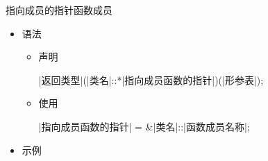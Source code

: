 \begin{frame}[t, fragile]{指向成员的指针}{函数成员}%
  \begin{itemize}
  \item 语法
    \begin{itemize}
    \item 声明\\
      \begin{center}
        \begin{minipage}{0.8\linewidth}
          \begin{cpptt}
|返回类型|(|类名|::*|指向成员函数的指针|)(|形参表|);
          \end{cpptt}
        \end{minipage}
      \end{center}  
    \item 使用\\
      \begin{center}
        \begin{minipage}{0.8\linewidth}
          \begin{cpptt}
|指向成员函数的指针| = &|类名|::|函数成员名称|;
          \end{cpptt}
        \end{minipage}
      \end{center}
    \end{itemize}    
  \item 示例\\
    \begin{center}
      \begin{minipage}{0.55\linewidth}
      \end{minipage}
      \begin{minipage}{0.4\linewidth}
      \end{minipage} 
    \end{center}
  \end{itemize}
\end{frame}

